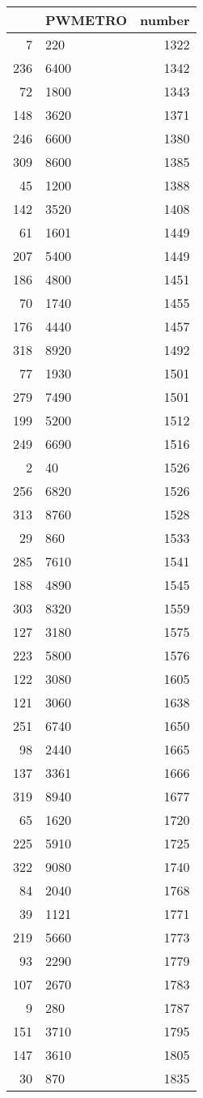 \begin{table}[ht]
\centering
\begin{tabular}{rlr}
  \hline
 & PWMETRO & number \\ 
  \hline
7 & 220 & 1322 \\ 
  236 & 6400 & 1342 \\ 
  72 & 1800 & 1343 \\ 
  148 & 3620 & 1371 \\ 
  246 & 6600 & 1380 \\ 
  309 & 8600 & 1385 \\ 
  45 & 1200 & 1388 \\ 
  142 & 3520 & 1408 \\ 
  61 & 1601 & 1449 \\ 
  207 & 5400 & 1449 \\ 
  186 & 4800 & 1451 \\ 
  70 & 1740 & 1455 \\ 
  176 & 4440 & 1457 \\ 
  318 & 8920 & 1492 \\ 
  77 & 1930 & 1501 \\ 
  279 & 7490 & 1501 \\ 
  199 & 5200 & 1512 \\ 
  249 & 6690 & 1516 \\ 
  2 & 40 & 1526 \\ 
  256 & 6820 & 1526 \\ 
  313 & 8760 & 1528 \\ 
  29 & 860 & 1533 \\ 
  285 & 7610 & 1541 \\ 
  188 & 4890 & 1545 \\ 
  303 & 8320 & 1559 \\ 
  127 & 3180 & 1575 \\ 
  223 & 5800 & 1576 \\ 
  122 & 3080 & 1605 \\ 
  121 & 3060 & 1638 \\ 
  251 & 6740 & 1650 \\ 
  98 & 2440 & 1665 \\ 
  137 & 3361 & 1666 \\ 
  319 & 8940 & 1677 \\ 
  65 & 1620 & 1720 \\ 
  225 & 5910 & 1725 \\ 
  322 & 9080 & 1740 \\ 
  84 & 2040 & 1768 \\ 
  39 & 1121 & 1771 \\ 
  219 & 5660 & 1773 \\ 
  93 & 2290 & 1779 \\ 
  107 & 2670 & 1783 \\ 
  9 & 280 & 1787 \\ 
  151 & 3710 & 1795 \\ 
  147 & 3610 & 1805 \\ 
  30 & 870 & 1835 \\ 
   \hline
\end{tabular}
\end{table}
